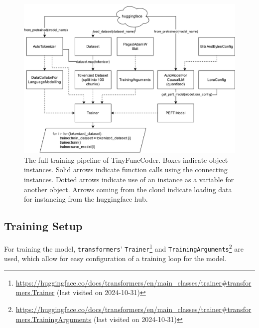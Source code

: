 \begin{figure}[H]
    \centering
    \includegraphics[width=\textwidth]{bilder/kapitel4/architecture.png}
    \caption{The full training pipeline of TinyFuncCoder. Boxes indicate object instances. Solid arrows indicate function calls using the connecting instances. Dotted arrows indicate use of an instance as a variable for another object. Arrows coming from the cloud indicate loading data for instancing from the huggingface hub.}
    \label{fig:architecture}
\end{figure}

\subsection{Training Setup}
\label{sec:setup}
For training the model, \texttt{transformers}' \texttt{Trainer}\footnote{\url{https://huggingface.co/docs/transformers/en/main_classes/trainer\#transformers.Trainer} (last visited on 2024-10-31)} and \texttt{TrainingArguments}\footnote{\url{https://huggingface.co/docs/transformers/en/main_classes/trainer\#transformers.TrainingArguments} (last visited on 2024-10-31)} are used, which allow for easy configuration of a training loop for the model.

